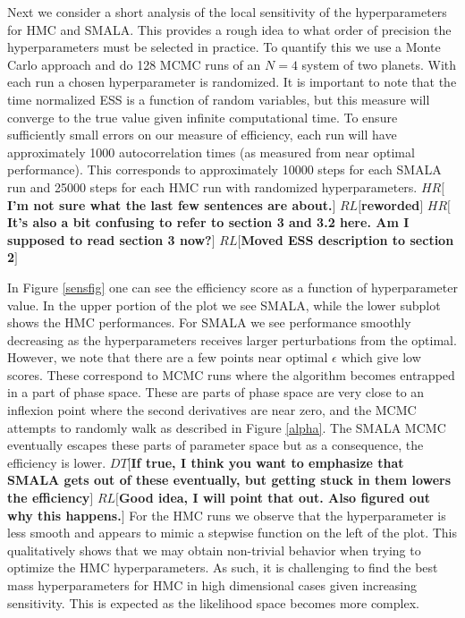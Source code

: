 \documentclass{aa}
\def\memohr#1{\color{blue}$HR[${\bf #1}$]$ \color{black}}
\def\memodt#1{\color{green}$DT[${\bf #1}$]$ \color{black}}
\def\memorl#1{\color{gray}$RL[${\bf #1}$]$ \color{black}}
\begin{document}
Next we consider a short analysis of the local sensitivity of the hyperparameters for HMC and SMALA. 
This provides a rough idea to what order of precision the hyperparameters must be selected in practice. 
To quantify this we use a Monte Carlo approach and do 128 MCMC runs of an $N=4$ system of two planets.
With each run a chosen hyperparameter is randomized. 
It is important to note that the time normalized ESS is a function of random variables, but this measure will converge to the true value given infinite computational time.
To ensure sufficiently small errors on our measure of efficiency, each run will have approximately 1000 autocorrelation times (as measured from near optimal performance). 
This corresponds to approximately 10000 steps for each SMALA run and 25000 steps for each HMC run with randomized hyperparameters. 
\memohr{I'm not sure what the last few sentences are about.}
\memorl{reworded}
\memohr{It's also a bit confusing to refer to section 3 and 3.2 here. Am I supposed to read section 3 now?}
\memorl{Moved ESS description to section 2}

In Figure \ref{sensfig} one can see the efficiency score as a function of hyperparameter value. 
In the upper portion of the plot we see SMALA, while the lower subplot shows the HMC performances. For SMALA we see performance smoothly decreasing as the hyperparameters receives larger perturbations from the optimal. 
However, we note that there are a few points near optimal $\epsilon$ which give low scores. 
These correspond to MCMC runs where the algorithm becomes entrapped in a part of phase space. 
These are parts of phase space are very close to an inflexion point where the second derivatives are near zero, and the MCMC attempts to randomly walk as described in Figure \ref{alpha}.
The SMALA MCMC eventually escapes these parts of parameter space but as a consequence, the efficiency is lower.
\memodt{If true, I think you want to emphasize that SMALA gets out of these eventually, but getting stuck in them lowers the efficiency}
\memorl{Good idea, I will point that out. Also figured out why this happens.}
For the HMC runs we observe that the hyperparameter is less smooth and appears to mimic a stepwise function on the left of the plot. 
This qualitatively shows that we may obtain non-trivial behavior when trying to optimize the HMC hyperparameters. 
As such, it is challenging to find the best mass hyperparameters for HMC in high dimensional cases given increasing sensitivity. 
This is expected as the likelihood space becomes more complex.
\end{document}
